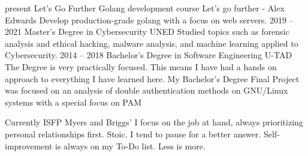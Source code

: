 \documentclass[9pt]{developercv} %
\begin{document}
\begin{entrylist}
	\entry
	  {present}
	  {Let's Go Further Golang development course}
    {Let's go further - Alex Edwards}
    {Develop production-grade golang with a focus on web servers.}
	\entry
	  {2019 -- 2021}
	  {Master's Degree in Cybersecurity}
    {UNED}
    {Studied topics such as forensic analysis and ethical hacking, malware analysis, and machine learning applied to Cybersecurity.}
	\entry
		{2014 -- 2018}
		{Bachelor's Degree in Software Engineering}
		{U-TAD}
		{The Degree is very practically focused. This means I have had a hands on approach to everything I have learned here.
		My Bachelor's Degree Final Project was focused on an analysis of double authentication methods on GNU/Linux systems with a special focus on PAM}
\end{entrylist}



\begin{entrylist}
	\entry
		{Currently}
		{ISFP}
		{Myers and Briggs'}
		{I focus on the job at hand, always prioritizing personal relationships first.
		Stoic.
		I tend to pause for a better answer.
		Self-improvement is always on my To-Do list.
		Less is more.}
\end{entrylist}

\end{document}
